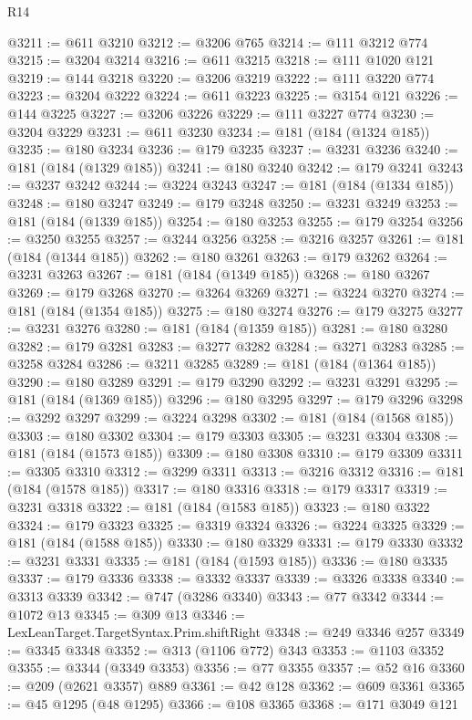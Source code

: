 \begin{lexlean}{R14}
\begin{coremodule}
@3211 := @611 @3210
@3212 := @3206 @765
@3214 := @111 @3212 @774
@3215 := @3204 @3214
@3216 := @611 @3215
@3218 := @111 @1020 @121
@3219 := @144 @3218
@3220 := @3206 @3219
@3222 := @111 @3220 @774
@3223 := @3204 @3222
@3224 := @611 @3223
@3225 := @3154 @121
@3226 := @144 @3225
@3227 := @3206 @3226
@3229 := @111 @3227 @774
@3230 := @3204 @3229
@3231 := @611 @3230
@3234 := @181 (@184 (@1324 @185))
@3235 := @180 @3234
@3236 := @179 @3235
@3237 := @3231 @3236
@3240 := @181 (@184 (@1329 @185))
@3241 := @180 @3240
@3242 := @179 @3241
@3243 := @3237 @3242
@3244 := @3224 @3243
@3247 := @181 (@184 (@1334 @185))
@3248 := @180 @3247
@3249 := @179 @3248
@3250 := @3231 @3249
@3253 := @181 (@184 (@1339 @185))
@3254 := @180 @3253
@3255 := @179 @3254
@3256 := @3250 @3255
@3257 := @3244 @3256
@3258 := @3216 @3257
@3261 := @181 (@184 (@1344 @185))
@3262 := @180 @3261
@3263 := @179 @3262
@3264 := @3231 @3263
@3267 := @181 (@184 (@1349 @185))
@3268 := @180 @3267
@3269 := @179 @3268
@3270 := @3264 @3269
@3271 := @3224 @3270
@3274 := @181 (@184 (@1354 @185))
@3275 := @180 @3274
@3276 := @179 @3275
@3277 := @3231 @3276
@3280 := @181 (@184 (@1359 @185))
@3281 := @180 @3280
@3282 := @179 @3281
@3283 := @3277 @3282
@3284 := @3271 @3283
@3285 := @3258 @3284
@3286 := @3211 @3285
@3289 := @181 (@184 (@1364 @185))
@3290 := @180 @3289
@3291 := @179 @3290
@3292 := @3231 @3291
@3295 := @181 (@184 (@1369 @185))
@3296 := @180 @3295
@3297 := @179 @3296
@3298 := @3292 @3297
@3299 := @3224 @3298
@3302 := @181 (@184 (@1568 @185))
@3303 := @180 @3302
@3304 := @179 @3303
@3305 := @3231 @3304
@3308 := @181 (@184 (@1573 @185))
@3309 := @180 @3308
@3310 := @179 @3309
@3311 := @3305 @3310
@3312 := @3299 @3311
@3313 := @3216 @3312
@3316 := @181 (@184 (@1578 @185))
@3317 := @180 @3316
@3318 := @179 @3317
@3319 := @3231 @3318
@3322 := @181 (@184 (@1583 @185))
@3323 := @180 @3322
@3324 := @179 @3323
@3325 := @3319 @3324
@3326 := @3224 @3325
@3329 := @181 (@184 (@1588 @185))
@3330 := @180 @3329
@3331 := @179 @3330
@3332 := @3231 @3331
@3335 := @181 (@184 (@1593 @185))
@3336 := @180 @3335
@3337 := @179 @3336
@3338 := @3332 @3337
@3339 := @3326 @3338
@3340 := @3313 @3339
@3342 := @747 (@3286 @3340)
@3343 := @77 @3342
@3344 := @1072 @13
@3345 := @309 @13
@3346 := LexLeanTarget.TargetSyntax.Prim.shiftRight
@3348 := @249 @3346 @257
@3349 := @3345 @3348
@3352 := @313 (@1106 @772) @343
@3353 := @1103 @3352
@3355 := @3344 (@3349 @3353)
@3356 := @77 @3355
@3357 := @52 @16
@3360 := @209 (@2621 @3357) @889
@3361 := @42 @128
@3362 := @609 @3361
@3365 := @45 @1295 (@48 @1295)
@3366 := @108 @3365
@3368 := @171 @3049 @121

\end{coremodule}
\end{lexlean}

